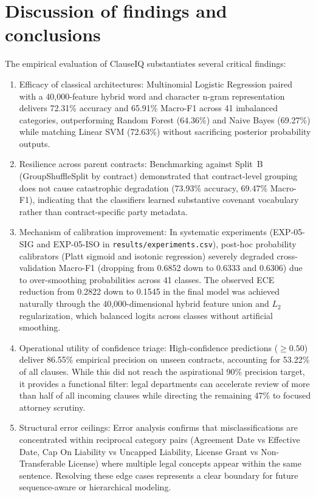 \section{Discussion of findings and conclusions}
\label{sec:discussion_findings}

The empirical evaluation of ClauseIQ substantiates several critical findings:

\begin{enumerate}
    \item Efficacy of classical architectures: Multinomial Logistic Regression paired with a 40,000-feature hybrid word and character n-gram representation delivers 72.31\% accuracy and 65.91\% Macro-F1 across 41 imbalanced categories, outperforming Random Forest (64.36\%) and Naive Bayes (69.27\%) while matching Linear SVM (72.63\%) without sacrificing posterior probability outputs.
    \item Resilience across parent contracts: Benchmarking against Split~B (GroupShuffleSplit by contract) demonstrated that contract-level grouping does not cause catastrophic degradation (73.93\% accuracy, 69.47\% Macro-F1), indicating that the classifiers learned substantive covenant vocabulary rather than contract-specific party metadata.
    \item Mechanism of calibration improvement: In systematic experiments (EXP-05-SIG and EXP-05-ISO in \texttt{results/experiments.csv}), post-hoc probability calibrators (Platt sigmoid and isotonic regression) severely degraded cross-validation Macro-F1 (dropping from 0.6852 down to 0.6333 and 0.6306) due to over-smoothing probabilities across 41 classes. The observed ECE reduction from 0.2822 down to 0.1545 in the final model was achieved naturally through the 40,000-dimensional hybrid feature union and $L_2$ regularization, which balanced logits across classes without artificial smoothing.
    \item Operational utility of confidence triage: High-confidence predictions ($\ge 0.50$) deliver 86.55\% empirical precision on unseen contracts, accounting for 53.22\% of all clauses. While this did not reach the aspirational 90\% precision target, it provides a functional filter: legal departments can accelerate review of more than half of all incoming clauses while directing the remaining 47\% to focused attorney scrutiny.
    \item Structural error ceilings: Error analysis confirms that misclassifications are concentrated within reciprocal category pairs (Agreement Date vs Effective Date, Cap On Liability vs Uncapped Liability, License Grant vs Non-Transferable License) where multiple legal concepts appear within the same sentence. Resolving these edge cases represents a clear boundary for future sequence-aware or hierarchical modeling.
\end{enumerate}
